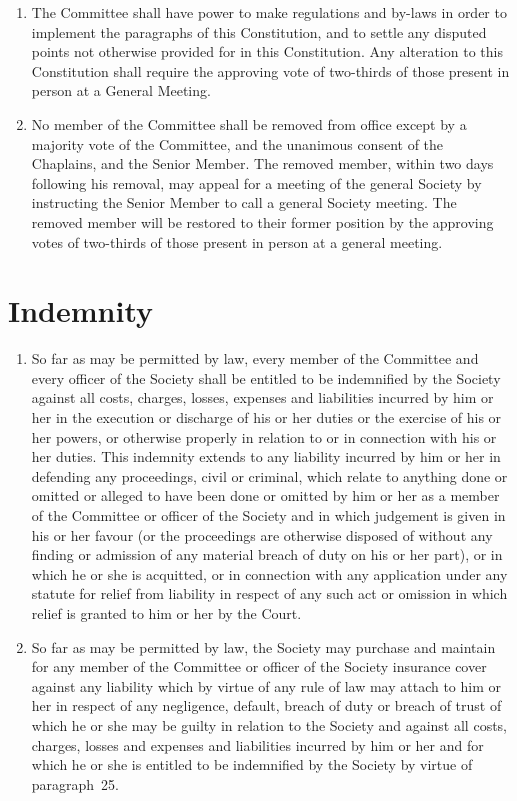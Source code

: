 \documentclass[11pt]{article}
\begin{document}
\begin{enumerate}
\item The Committee shall have power to make regulations and by-laws in order to implement the paragraphs of this Constitution, and to settle any disputed points not otherwise provided for in this Constitution. Any alteration to this Constitution shall require the approving vote of two-thirds of those present in person at a General Meeting.
\item No member of the Committee shall be removed from office except by a majority vote of the Committee, and the unanimous consent of the Chaplains, and the Senior Member. The removed member, within two days following his removal, may appeal for a meeting of the general Society by instructing the Senior Member to call a general Society meeting. The removed member will be restored to their former position by the approving votes of two-thirds of those present in person at a general meeting.
\end{enumerate}
\section{Indemnity}
\begin{enumerate}
\item So far as may be permitted by law, every member of the Committee and every officer of the Society shall be entitled to be indemnified by the Society against all costs, charges, losses, expenses and liabilities incurred by him or her in the execution or discharge of his or her duties or the exercise of his or her powers, or otherwise properly in relation to or in connection with his or her duties. This indemnity extends to any liability incurred by him or her in defending any proceedings, civil or criminal, which relate to anything done or omitted or alleged to have been done or omitted by him or her as a member of the Committee or officer of the Society and in which judgement is given in his or her favour (or the proceedings are otherwise disposed of without any finding or admission of any material breach of duty on his or her part), or in which he or she is acquitted, or in connection with any application under any statute for relief from liability in respect of any such act or omission in which relief is granted to him or her by the Court.
\item So far as may be permitted by law, the Society may purchase and maintain for any member of the Committee or officer of the Society insurance cover against any liability which by virtue of any rule of law may attach to him or her in respect of any negligence, default, breach of duty or breach of trust of which he or she may be guilty in relation to the Society and against all costs, charges, losses and expenses and liabilities incurred by him or her and for which he or she is entitled to be indemnified by the Society by virtue of paragraph~25.
\end{enumerate}
\end{document}
